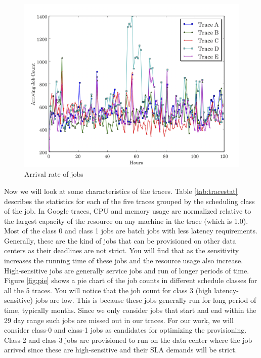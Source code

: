 \documentclass[conference,12pt]{IEEEtran}
\begin{document}
\begin{figure}[] 
\centering
\includegraphics[scale=0.3]{arrivalrate.png}
\caption{Arrival rate of jobs }
\label{fig:arrivalrate}
\end{figure}

Now we will look at some characteristics of the traces. Table \ref{tab:tracestat} describes the statistics for each of the five traces grouped by the scheduling class of the job. In Google traces, CPU and memory usage are normalized relative to the largest capacity of the resource on any machine in the trace (which is 1.0). Most of the class 0 and class 1 jobs are batch jobs with less latency requirements. Generally, these are the kind of jobs that can be provisioned on other data centers as their deadlines are not strict.  You will find that as the sensitivity increases the running time of these jobs and the resource usage also increase. High-sensitive jobs are generally service jobs and run of longer periods of time. Figure \ref{fig:pie} shows a pie chart of the job counts in different schedule classes for all the 5 traces. You will notice that the job count for class 3 (high latency-sensitive) jobs are low. This is because these jobs generally run for long period of time, typically months. Since we only consider jobs that start and end within the 29 day range such jobs are missed out in our traces. For our work, we will consider class-0 and class-1 jobs as candidates for optimizing the provisioning. Class-2 and class-3 jobs are provisioned to run on the data center where the job arrived since these are high-sensitive and their SLA demands will be strict. 
\end{document}
